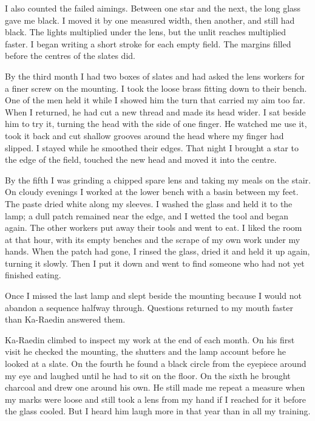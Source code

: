 I also counted the failed aimings. Between one star and the next, the long glass gave me black. I moved it by one measured width, then another, and still had black. The lights multiplied under the lens, but the unlit reaches multiplied faster. I began writing a short stroke for each empty field. The margins filled before the centres of the slates did.\par

By the third month I had two boxes of slates and had asked the lens workers for a finer screw on the mounting. I took the loose brass fitting down to their bench. One of the men held it while I showed him the turn that carried my aim too far. When I returned, he had cut a new thread and made its head wider. I sat beside him to try it, turning the head with the side of one finger. He watched me use it, took it back and cut shallow grooves around the head where my finger had slipped. I stayed while he smoothed their edges. That night I brought a star to the edge of the field, touched the new head and moved it into the centre.\par

By the fifth I was grinding a chipped spare lens and taking my meals on the stair. On cloudy evenings I worked at the lower bench with a basin between my feet. The paste dried white along my sleeves. I washed the glass and held it to the lamp; a dull patch remained near the edge, and I wetted the tool and began again. The other workers put away their tools and went to eat. I liked the room at that hour, with its empty benches and the scrape of my own work under my hands. When the patch had gone, I rinsed the glass, dried it and held it up again, turning it slowly. Then I put it down and went to find someone who had not yet finished eating.\par

Once I missed the last lamp and slept beside the mounting because I would not abandon a sequence halfway through. Questions returned to my mouth faster than Ka-Raedin answered them.\par

Ka-Raedin climbed to inspect my work at the end of each month. On his first visit he checked the mounting, the shutters and the lamp account before he looked at a slate. On the fourth he found a black circle from the eyepiece around my eye and laughed until he had to sit on the floor. On the sixth he brought charcoal and drew one around his own. He still made me repeat a measure when my marks were loose and still took a lens from my hand if I reached for it before the glass cooled. But I heard him laugh more in that year than in all my training.\par


